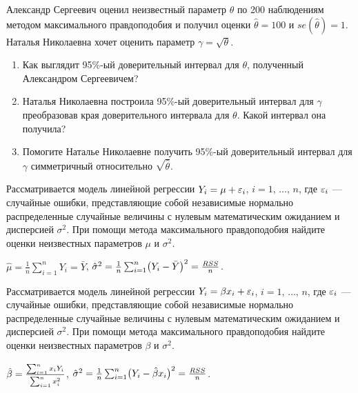 \begin{problem}
Александр Сергеевич оценил неизвестный параметр $\theta$ по 200 наблюдениям методом максимального правдоподобия и получил оценки $\hat{\theta}=100$ и $se(\hat{\theta})=1$. Наталья Николаевна хочет оценить параметр $\gamma=\sqrt{\theta}$.

\begin{enumerate}
\item Как выглядит 95\%-ый доверительный интервал для $\theta$, полученный Александром Сергеевичем?
\item Наталья Николаевна построила 95\%-ый доверительный интервал для $\gamma$ преобразовав края доверительного интервала для $\theta$. Какой интервал она получила?
\item Помогите Наталье Николаевне получить  95\%-ый доверительный интервал для  $\gamma$ симметричный относительно $\sqrt{\hat{\theta}}$.
\end{enumerate}

\begin{sol}
\end{sol}
\end{problem}

\begin{problem}
Рассматривается модель линейной регрессии $Y_i = \mu + \varepsilon_i$, $i = 1, \, \ldots, \, n$, где $\varepsilon_i$ — случайные ошибки, представляющие собой независимые нормально распределенные случайные величины с нулевым математическим ожиданием и дисперсией $\sigma^2$. При помощи метода максимального правдоподобия найдите оценки неизвестных параметров $\mu$ и  $\sigma^2$.

\begin{sol}
$\widehat{\mu} = \tfrac{1}{n}\sum_{i=1}^{n}Y_i = \bar{Y}$, \;\; $\hat{\sigma}^2 = \tfrac{1}{n}\sum_{i=1}^{n}\bigl(Y_i - \bar{Y}\bigr)^2 = \tfrac{RSS}{n}$.
\end{sol}
\end{problem}

\begin{problem}
Рассматривается модель линейной регрессии $Y_i = \beta x_i + \varepsilon_i$, $i = 1, \, \ldots, \, n$, где $\varepsilon_i$ — случайные ошибки, представляющие собой независимые нормально распределенные случайные величины с нулевым математическим ожиданием и дисперсией $\sigma^2$. При помощи метода максимального правдоподобия найдите оценки неизвестных параметров $\beta$ и  $\sigma^2$.

\begin{sol}
$\hat{\beta} = \tfrac{\bigl. \sum_{i=1}^{n}x_i Y_i}{\bigl. \sum_{i=1}^{n}x_i^2}$, \;\; $\hat{\sigma}^2 = \tfrac{1}{n}\sum_{i=1}^{n}\bigl(Y_i - \hat{\beta} x_i\bigr)^2 = \tfrac{RSS}{n}$.
\end{sol}
\end{problem}

